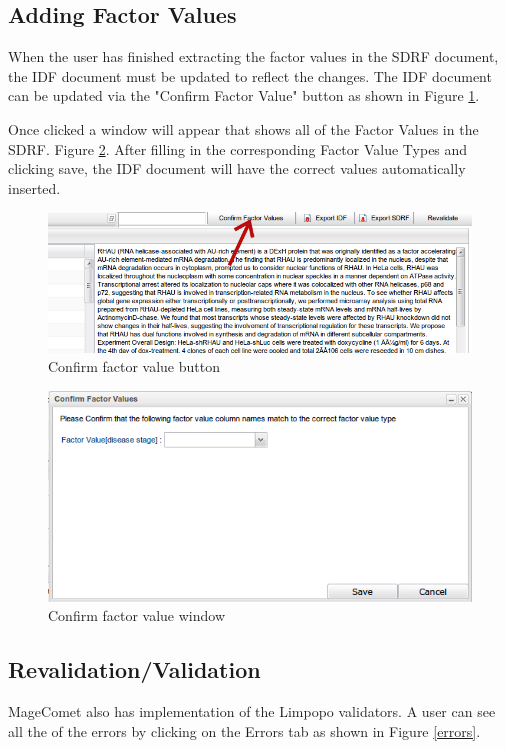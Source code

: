 \documentclass[a4paper]{article}
\begin{document}
\subsection{Adding Factor Values}
When the user has finished extracting the factor values in the SDRF document, the IDF document must be updated to reflect the changes. The IDF document can be updated via the "Confirm Factor Value" button as shown in Figure \ref{confirmfactorbutton}.

Once clicked a window will appear that shows all of the Factor Values in the SDRF. Figure \ref{confirmfactorvalue}. After filling in the corresponding Factor Value Types and clicking save, the IDF document will have the correct values automatically inserted.




\begin{figure}[h]
\caption{Confirm factor value button}
\centering
\label{confirmfactorbutton}
\includegraphics[width=17cm]{images/confirmfactorbutton}
\end{figure}



\begin{figure}[h]
\caption{Confirm factor value window}
\centering
\label{confirmfactorvalue}
\includegraphics[width=12cm]{images/confirmfactorvalues}
\end{figure}

\subsection{Revalidation/Validation}
MageComet also has implementation of the Limpopo validators. A user can see all the of the errors by clicking on the Errors tab as shown in Figure \ref{errors}. 
\end{document}
